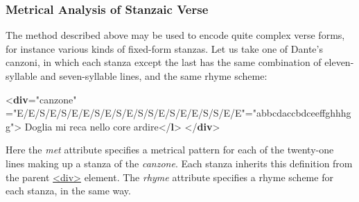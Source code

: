 \subsubsection[{Metrical Analysis of Stanzaic Verse}]{Metrical Analysis of Stanzaic Verse}\label{VEMEana}\par
The method described above may be used to encode quite complex verse forms, for instance various kinds of fixed-form stanzas. Let us take one of Dante's canzoni, in which each stanza except the last has the same combination of eleven-syllable and seven-syllable lines, and the same rhyme scheme: \par\bgroup{}\exampleFont \begin{shaded}\noindent\mbox{}{<\textbf{div}\hspace*{1em}{type}="{canzone}"\mbox{}\newline 
\hspace*{1em}{met}="{E/E/S/E/S/E/E/S/E/S/E/S/S/E/S/E/E/S/S/E/E}"\hspace*{1em}{rhyme}="{abbcdaccbdceeffghhhgg}">}\mbox{}\newline 
{}\mbox{}\newline 
\hspace*{1em}Doglia mi reca nello core ardire{</\textbf{l}>}\mbox{}\newline 
{}\mbox{}\newline 
{</\textbf{div}>}\end{shaded}\egroup\par \noindent  \par
Here the {\itshape met} attribute specifies a metrical pattern for each of the twenty-one lines making up a stanza of the \textit{canzone}. Each stanza inherits this definition from the parent \hyperref[TEI.div]{<div>} element. The {\itshape rhyme} attribute specifies a rhyme scheme for each stanza, in the same way.\par
